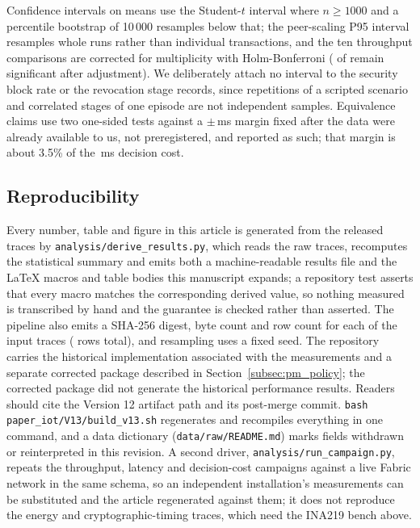 \documentclass[a4paper,fleqn]{cas-sc}
\begin{document}
Confidence intervals on means use the Student-$t$ interval where
$n \ge 1000$ and a percentile bootstrap of 10\,000 resamples below that;
the peer-scaling P95 interval resamples whole runs rather than individual
transactions, and the ten throughput comparisons are corrected for
multiplicity with Holm-Bonferroni (\OverheadHolmSig{} of \OverheadLevels{}
remain significant after adjustment). We deliberately attach no interval
to the security block rate or the revocation stage records, since
repetitions of a scripted scenario and correlated stages of one episode
are not independent samples. Equivalence claims use two one-sided tests
against a $\pm$\DecisionMargin\,ms margin fixed after the data were
already available to us, not preregistered, and reported as such; that
margin is about 3.5\% of the \DecisionMean\,ms decision cost.

\subsection{Reproducibility}
\label{subsec:repro}

Every number, table and figure in this article is generated from the
released traces by \texttt{analysis/derive\_results.py}, which reads the
raw traces, recomputes the statistical summary and emits both a
machine-readable results file and the LaTeX macros and table bodies this
manuscript expands; a repository test asserts that every macro matches the
corresponding derived value, so nothing measured is transcribed by hand
and the guarantee is checked rather than asserted. The pipeline also emits
a SHA-256 digest, byte count and row count for each of the \TraceCount{}
input traces (\TraceRows{} rows total), and resampling uses a fixed seed.
The repository carries the historical implementation associated with the
measurements and a separate corrected package described in
Section~\ref{subsec:pm_policy}; the corrected package did not generate the
historical performance results. Readers should cite the Version 12 artifact
path and its post-merge commit. \texttt{bash
paper\_iot/V13/build\_v13.sh} regenerates and recompiles everything in one
command, and a data dictionary (\texttt{data/raw/README.md}) marks fields
withdrawn or reinterpreted in this revision. A second driver,
\texttt{analysis/run\_campaign.py}, repeats the throughput, latency and
decision-cost campaigns against a live Fabric network in the same schema,
so an independent installation's measurements can be substituted and the
article regenerated against them; it does not reproduce the energy and
cryptographic-timing traces, which need the INA219 bench above.
\end{document}
